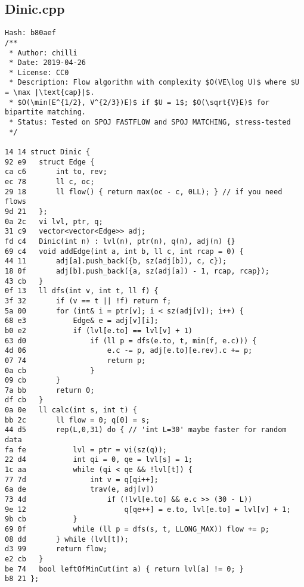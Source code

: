\documentclass[11pt, a4paper, twoside]{article}
\begin{document}
\subsection{Dinic.cpp}
\begin{lstlisting}
Hash: b80aef
/**
 * Author: chilli
 * Date: 2019-04-26
 * License: CC0
 * Description: Flow algorithm with complexity $O(VE\log U)$ where $U = \max |\text{cap}|$.
 * $O(\min(E^{1/2}, V^{2/3})E)$ if $U = 1$; $O(\sqrt{V}E)$ for bipartite matching.
 * Status: Tested on SPOJ FASTFLOW and SPOJ MATCHING, stress-tested
 */

14 14 struct Dinic {
92 e9 	struct Edge {
ca c6 		int to, rev;
ec 78 		ll c, oc;
29 18 		ll flow() { return max(oc - c, 0LL); } // if you need flows
9d 21 	};
0a 2c 	vi lvl, ptr, q;
31 c9 	vector<vector<Edge>> adj;
fd c4 	Dinic(int n) : lvl(n), ptr(n), q(n), adj(n) {}
69 c4 	void addEdge(int a, int b, ll c, int rcap = 0) {
44 11 		adj[a].push_back({b, sz(adj[b]), c, c});
18 0f 		adj[b].push_back({a, sz(adj[a]) - 1, rcap, rcap});
43 cb 	}
0f 13 	ll dfs(int v, int t, ll f) {
3f 32 		if (v == t || !f) return f;
5a 00 		for (int& i = ptr[v]; i < sz(adj[v]); i++) {
68 e3 			Edge& e = adj[v][i];
b0 e2 			if (lvl[e.to] == lvl[v] + 1)
63 d0 				if (ll p = dfs(e.to, t, min(f, e.c))) {
4d 06 					e.c -= p, adj[e.to][e.rev].c += p;
07 74 					return p;
0a cb 				}
09 cb 		}
7a bb 		return 0;
df cb 	}
0a 0e 	ll calc(int s, int t) {
bb 2c 		ll flow = 0; q[0] = s;
44 d5 		rep(L,0,31) do { // 'int L=30' maybe faster for random data
fa fe 			lvl = ptr = vi(sz(q));
22 d4 			int qi = 0, qe = lvl[s] = 1;
1c aa 			while (qi < qe && !lvl[t]) {
77 7d 				int v = q[qi++];
6a de 				trav(e, adj[v])
73 4d 					if (!lvl[e.to] && e.c >> (30 - L))
9e 12 						q[qe++] = e.to, lvl[e.to] = lvl[v] + 1;
9b cb 			}
69 0f 			while (ll p = dfs(s, t, LLONG_MAX)) flow += p;
08 dd 		} while (lvl[t]);
d3 99 		return flow;
e2 cb 	}
be 74 	bool leftOfMinCut(int a) { return lvl[a] != 0; }
b8 21 };
\end{lstlisting}
\end{document}
